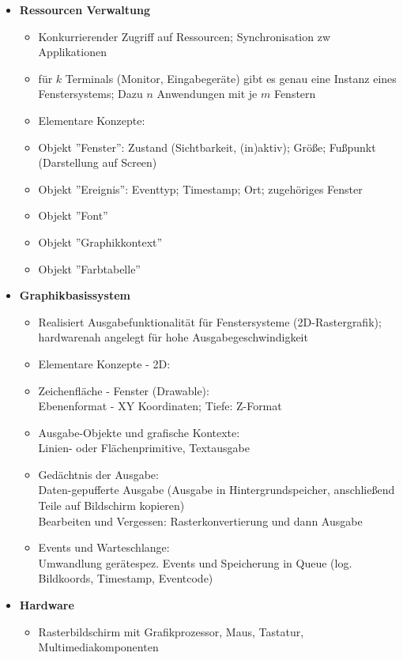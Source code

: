 \begin{enumerate}
\begin{itemize}
\begin{itemize}
		\end{itemize}
		\item \textbf{Ressourcen Verwaltung}
		\begin{itemize}
			\item Konkurrierender Zugriff auf Ressourcen; Synchronisation zw Applikationen
			\item für $k$ Terminals (Monitor, Eingabegeräte) gibt es genau eine Instanz eines Fenstersystems; Dazu $n$ Anwendungen mit je $m$ Fenstern
			\item Elementare Konzepte:
			\item Objekt ''Fenster'': Zustand (Sichtbarkeit, (in)aktiv); Größe; Fußpunkt (Darstellung auf Screen)
			\item Objekt ''Ereignis'': Eventtyp; Timestamp; Ort; zugehöriges Fenster
			\item Objekt ''Font''
			\item Objekt ''Graphikkontext''
			\item Objekt ''Farbtabelle''
		\end{itemize}
		\item \textbf{Graphikbasissystem}
		\begin{itemize}
			\item Realisiert Ausgabefunktionalität für Fenstersysteme (2D-Rastergrafik); hardwarenah angelegt für hohe Ausgabegeschwindigkeit
			\item Elementare Konzepte - 2D:
			\item Zeichenfläche - Fenster (Drawable):\\
			Ebenenformat - XY Koordinaten; Tiefe: Z-Format
			\item Ausgabe-Objekte und grafische Kontexte:\\
			Linien- oder Flächenprimitive, Textausgabe
			\item Gedächtnis der Ausgabe:\\
			Daten-gepufferte Ausgabe (Ausgabe in Hintergrundspeicher, anschließend Teile auf Bildschirm kopieren)\\
			Bearbeiten und Vergessen: Rasterkonvertierung und dann Ausgabe
			\item Events und Warteschlange:\\
			Umwandlung gerätespez. Events und Speicherung in Queue (log. Bildkoords, Timestamp, Eventcode)
		\end{itemize}
		\item \textbf{Hardware}
		\begin{itemize}
			\item Rasterbildschirm mit Grafikprozessor, Maus, Tastatur, Multimediakomponenten
		\end{itemize}
	\end{itemize}
	

\end{enumerate}

